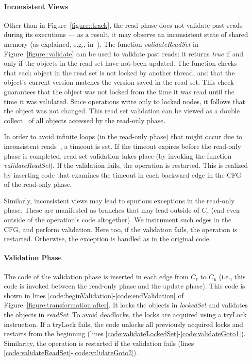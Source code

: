 \paragraph{Inconsistent Views}
Other than in Figure~\ref{figure::track}, the read phase does not validate past reads during its executions ---
as a result, it may observe an inconsistent state of shared memory (as explained, e.g., in~\cite{todo}).
%
The function \emph{validateReadSet} in Figure~\ref{figure::validate} can be used to validate past reads: it returns \emph{true} if and only if the objects in the read set have not been updated.
%
The function checks that each object in the read set is not locked by another thread,
and that the object's current version matches the version saved in the
read set.
This check guarantees that the object was not locked from the time it was read until
the time it was validated.
Since operations write only to
locked nodes, it follows that the object was not changed.
This read set validation can be viewed as a double collect~\cite{Afek:1993:ASS:153724.153741}
of all objects accessed by the read-only phase.

In order to avoid infinite loops (in the read-only phase) that might occur due to inconsistent reads~\cite{HLR:SLCA2010}, a timeout is set.
If the timeout expires before the read-only phase is completed, read set
validation takes place (by invoking the function \emph{validateReadSet}). If the validation fails, the operation is restarted.
This is realized by inserting code that examines the timeout in each backward edge in the CFG of the read-only phase.

Similarly, inconsistent views may lead to spurious exceptions in the read-only phase. These are manifested as branches that
may lead outside of $C_r$ (end even outside of the operation's code altogether). We instrument such edges in the CFG, and
perform validation. Here too, if the validation fails, the operation is restarted. Otherwise, the exception is handled as in
the original code.


\paragraph{Validation Phase}
The code of the validation phase is inserted in each edge from $C_r$ to $C_u$ (i.e., this code is invoked between the read-only phase and the update phase).
This code is shown in lines \ref{code:beginValidation}-\ref{code:endValidation} of Figure~\ref{figure:transformation:after}.
It locks the objects in \emph{lockedSet} and validates the objects in \emph{readSet}.
To avoid deadlocks, the locks are acquired using a tryLock
instruction.
If a tryLock fails, the code unlocks  all
previously acquired locks and restarts from the beginning
(lines \ref{code:validateLockedSet}-\ref{code:validateGoto1}).
Similarity, the operation is restarted if the validation fails (lines \ref{code:validateReadSet}-\ref{code:validateGoto2}).

